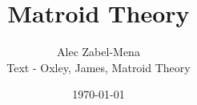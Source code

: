 \documentclass[12pt]{book}
\date{\today}
\title{Matroid Theory}
\author{Alec Zabel-Mena \\ Text - Oxley, James, Matroid Theory \cite{oxley}}
\theoremstyle{plain}
\theoremstyle{definition}
\theoremstyle{remark}
\begin{document}
\maketitle
\tableofcontents



\nocite{*}



\end{document}
